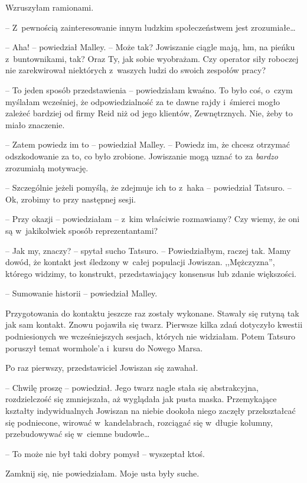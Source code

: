 \documentclass[oneside,polish,11pt,sfheadings]{mwbk}
\begin{document}
Wzruszyłam ramionami. 

-- Z~pewnością zainteresowanie innym ludzkim
społeczeństwem jest zrozumiałe\ldots 

-- Aha! -- powiedział Malley. -- Może tak? Jowiszanie ciągle mają, hm, na
pieńku z~buntownikami, tak? Oraz Ty, jak sobie wyobrażam. Czy operator
siły roboczej nie zarekwirował niektórych z~waszych ludzi do swoich
zespołów pracy?

-- To jeden sposób przedstawienia -- powiedziałam kwaśno. To było coś, o~czym myślałam wcześniej, że odpowiedzialność za te dawne rajdy i~śmierci
mogło zależeć bardziej od firmy Reid niż od jego klientów, Zewnętrznych.
Nie, żeby to miało znaczenie.

-- Zatem powiedz im to -- powiedział Malley. -- Powiedz im, że chcesz
otrzymać odszkodowanie za to, co było zrobione. Jowiszanie mogą uznać to
za \textit{bardzo} zrozumiałą motywację.

-- Szczególnie jeżeli pomyślą, że zdejmuje ich to z~haka -- powiedział
Tatsuro. -- Ok, zrobimy to przy następnej sesji.

-- Przy okazji -- powiedziałam -- z~kim właściwie rozmawiamy? Czy wiemy, że
oni są w~jakikolwiek sposób reprezentantami?

-- Jak my, znaczy? -- spytał sucho Tatsuro. -- Powiedziałbym, raczej tak.
Mamy dowód, że kontakt jest śledzony w~całej populacji Jowiszan.
,,Mężczyzna'', którego widzimy, to konstrukt, przedstawiający konsensus
lub zdanie większości.

-- Sumowanie historii -- powiedział Malley.

Przygotowania do kontaktu jeszcze raz zostały wykonane. Stawały się
rutyną tak jak sam kontakt. Znowu pojawiła się twarz. Pierwsze kilka
zdań dotyczyło kwestii podniesionych we wcześniejszych sesjach, których
nie widziałam. Potem Tatsuro poruszył temat wormhole'a i~kursu do Nowego
Marsa.

Po raz pierwszy, przedstawiciel Jowiszan się zawahał. 

-- Chwilę proszę -- powiedział. Jego twarz nagle stała się abstrakcyjna, rozdzielczość się
zmniejszała, aż wyglądała jak pusta maska. Przemykające kształty
indywidualnych Jowiszan na niebie dookoła niego zaczęły przekształcać
się podniecone, wirować w~kandelabrach, rozciągać się w~długie kolumny,
przebudowywać się w~ciemne budowle\ldots 

-- To może nie był taki dobry pomysł -- wyszeptał ktoś.

Zamknij się, nie powiedziałam. Moje usta były suche.
\end{document}
